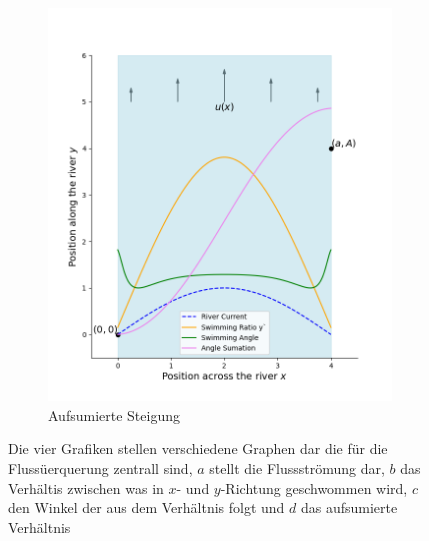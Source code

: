 \begin{figure}
\begin{subfigure}{0.48\textwidth}
        \includegraphics[width=\textwidth]{papers/schwimmen/Grafiken/Figure_5.png}	
        \caption{Aufsumierte Steigung}
        \label{fig:sin_velocity}
    \end{subfigure}
    \par\bigskip
    \caption{Die vier Grafiken stellen verschiedene Graphen dar die für die Flussüerquerung zentrall sind, \(a\) stellt die Flussströmung dar, \(b\) das Verhältis zwischen was in \(x\)- und \(y\)-Richtung geschwommen wird, \(c\) den Winkel der aus dem Verhältnis folgt und \(d\) das aufsumierte Verhältnis}
    \label{fig:river_pfrofiles}
\end{figure}




